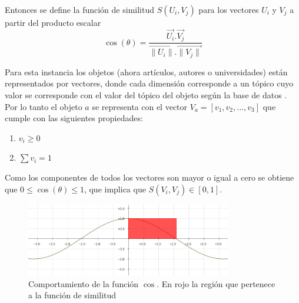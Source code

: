 Entonces se define la función de similitud $S(U_i, V_j)$ para los vectores $U_i$ y $V_j$ a partir del producto escalar\\

\begin{equation} \label{eq:angulovectorial}
\cos(\theta) =  \dfrac{\overrightarrow{U_i} . \overrightarrow{V_j}}{\overrightarrow{\lVert U_i\lVert}.\overrightarrow{\lVert V_j\lVert}}
\end{equation}

Para esta instancia los objetos (ahora artículos, autores o universidades) están representados por vectores, donde cada dimensión corresponde a un tópico cuyo valor se corresponde con el valor del tópico del objeto según la base de datos \cite{dataDrive}. Por lo tanto el objeto $a$ se representa con el vector $V_a = [v_1,v_2,...,v_3]$ que cumple con las siguientes propiedades:
\begin{enumerate}
 \item $v_i \geq 0$
 \item $\sum{v_i} = 1$
\end{enumerate}

Como los componentes de todos los vectores son mayor o igual a cero se obtiene que $0\leq\cos(\theta)\leq1$, que implica que $S(V_i, V_j) \in \left[0, 1\right]$.

\begin{figure}[H]
\includegraphics[width=0.8\textwidth]{img/coseno.png}
\caption{Comportamiento de la función $\cos$. En rojo la región que pertenece a la función de similitud}
\label{bus:img-coseno}
\end{figure}


